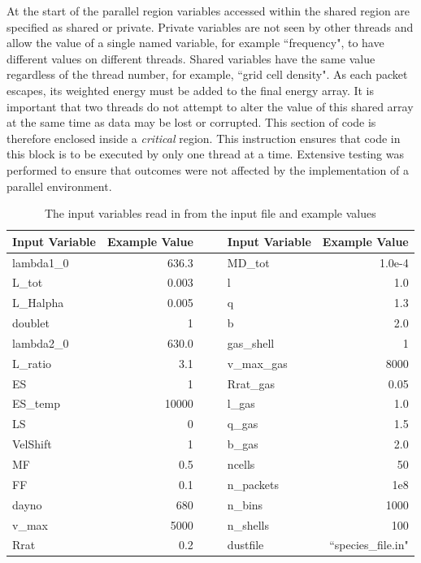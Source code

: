 	At the start of the parallel region variables accessed within the shared region are specified as shared or private.  Private variables are not seen by other threads and allow the value of a single named variable, for example ``frequency", to have different values on different threads.  Shared variables have the same value regardless of the thread number, for example, ``grid cell density".  As each packet escapes, its weighted energy must be added to the final energy array.  It is important that two threads do not attempt to alter the value of this shared array at the same time as data may be lost or corrupted. This section of code is therefore enclosed inside a \textit{critical} region.  This instruction ensures that code in this block is to be executed by only one thread at a time.  Extensive testing was performed to ensure that outcomes were not affected by the implementation of a parallel environment.
	
	\begin{table}[!t]
	\caption{The input variables read in from the input file and example values}
	\begin{center}
	\def\arraystretch{1.5}
	\begin{tabular}{l r c c l r}
	\toprule
	Input Variable & Example Value &&& Input Variable & Example Value\\
	\midrule
	lambda1\_0 & 636.3 &&& MD\_tot & 1.0e-4\\
	L\_tot & 0.003 &&& l & 1.0\\
	L\_Halpha & 0.005 &&& q & 1.3\\
	doublet & 1 &&& b & 2.0\\
	lambda2\_0 & 630.0 &&& gas\_shell & 1\\
	L\_ratio & 3.1&&& v\_max\_gas & 8000\\
	ES & 1 &&& Rrat\_gas & 0.05\\
	ES\_temp & 10000 &&& l\_gas & 1.0\\
	LS & 0 &&& q\_gas & 1.5\\
	VelShift & 1 &&& b\_gas & 2.0\\
	MF & 0.5 &&& ncells & 50\\
	FF & 0.1 &&& n\_packets & 1e8\\
	dayno & 680 &&& n\_bins & 1000\\
	v\_max & 5000 &&& n\_shells & 100\\
	Rrat & 0.2 &&& dustfile & ``species\_file.in"\\
	\bottomrule
	\end{tabular}
	\end{center}
	\label{tbl:input}
\end{table}%

